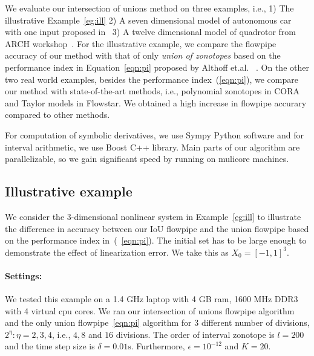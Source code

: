 We evaluate our intersection of unions method on three examples, i.e.,
1) The illustrative Example~\ref{eg:ill} 2) A seven dimensional model
of autonomous car with one input proposed in~ 3) A twelve dimensional
model of quadrotor from ARCH workshop~.  For the illustrative example,
we compare the flowpipe accuracy of our method with that of only
\emph{union of zonotopes} based on the performance index in
Equation~\ref{eqn:pi} proposed by Althoff
et.al.~\cite{althoff2008reachability} .  On the other two real world
examples, besides the performance index~(\ref{eqn:pi}), we compare our
method with state-of-the-art methods, i.e., polynomial
zonotopes in CORA and Taylor models in Flowstar.  We obtained a high
increase in flowpipe accurary compared to other methods.

For computation of symbolic derivatives, we use Sympy Python software and for
interval arithmetic, we use Boost C++ library.  Main parts of
our algorithm are parallelizable, so we gain significant speed by
running on mulicore machines.

\subsection{Illustrative example}
We consider the 3-dimensional nonlinear system in Example~\ref{eg:ill}
to illustrate the difference in accuracy between our IoU flowpipe and
the union flowpipe based on the performance index
in~\cite{althoff2008reachability}(~\ref{eqn:pi}).  The initial set has
to be large enough to demonstrate the effect of linearization error.  We
take this as $X_0 = [-1,1]^3$.
\paragraph{Settings:}  We tested this example on a 1.4 GHz
laptop with 4 GB ram, 1600 MHz DDR3 with 4 virtual cpu cores.  We ran
our intersection of unions flowpipe algorithm and the only union
flowpipe~\ref{eqn:pi} algorithm for 3 different number of divisions,
$2^\eta:\eta = 2, 3,4$, i.e., $4, 8$ and $16$ divisions. The order of
interval zonotope is $l = 200$ and the time step size is $\delta =
0.01\si{\second}$.  Furthermore, $\epsilon = 10^{-12}$ and $K = 20$.

